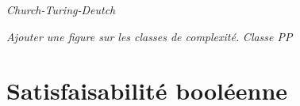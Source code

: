 
\textcolor{mydarkred}{\textit{Church-Turing-Deutch}}

\textcolor{mydarkred}{\textit{Ajouter une figure sur les classes de complexité.}}
\textcolor{mydarkred}{\textit{Classe PP}}


\section{Satisfaisabilité booléenne}
\label{sec:satisfaisabilite-booleenne}

